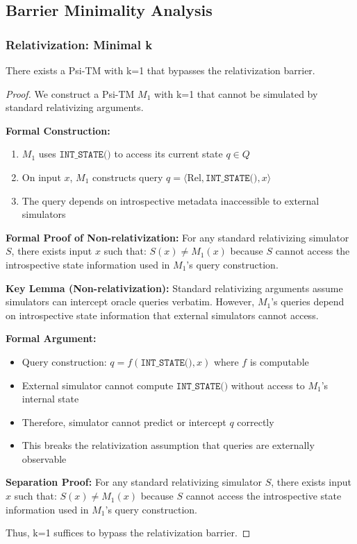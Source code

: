 \documentclass[11pt]{article}
\begin{document}
\subsection{Barrier Minimality Analysis}

\subsubsection{Relativization: Minimal k}

\begin{theorem}[Relativization Bypass with k=1]
\label{thm:relativization-k1}
There exists a Psi-TM with k=1 that bypasses the relativization barrier.
\end{theorem}

\begin{proof}
We construct a Psi-TM $M_1$ with k=1 that cannot be simulated by standard relativizing arguments.

\textbf{Formal Construction:}
\begin{enumerate}
\item $M_1$ uses $\texttt{INT\_STATE()}$ to access its current state $q \in Q$
\item On input $x$, $M_1$ constructs query $q = \langle \text{Rel}, \texttt{INT\_STATE()}, x \rangle$
\item The query depends on introspective metadata inaccessible to external simulators
\end{enumerate}

\textbf{Formal Proof of Non-relativization:}
For any standard relativizing simulator $S$, there exists input $x$ such that:
$S(x) \neq M_1(x)$ because $S$ cannot access the introspective state information used in $M_1$'s query construction.

\textbf{Key Lemma (Non-relativization):} Standard relativizing arguments assume simulators can intercept oracle queries verbatim. However, $M_1$'s queries depend on introspective state information that external simulators cannot access.

\textbf{Formal Argument:}
\begin{itemize}
\item Query construction: $q = f(\texttt{INT\_STATE()}, x)$ where $f$ is computable
\item External simulator cannot compute $\texttt{INT\_STATE()}$ without access to $M_1$'s internal state
\item Therefore, simulator cannot predict or intercept $q$ correctly
\item This breaks the relativization assumption that queries are externally observable
\end{itemize}

\textbf{Separation Proof:}
For any standard relativizing simulator $S$, there exists input $x$ such that:
$S(x) \neq M_1(x)$ because $S$ cannot access the introspective state information used in $M_1$'s query construction.

Thus, k=1 suffices to bypass the relativization barrier.
\end{proof}
\end{document}
